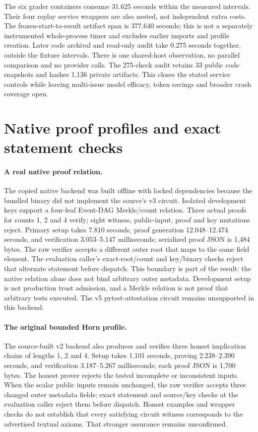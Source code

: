 The six grader containers consume 31.625 seconds within the measured
intervals. Their four replay service wrappers are also nested, not independent
extra costs. The frozen-start-to-result artifact span is 377.640 seconds;
this is not a separately instrumented whole-process timer and excludes earlier
imports and profile creation. Later code archival and read-only audit take
0.275 seconds together, outside the fixture intervals. There is one
shared-host observation, no parallel comparison and no provider calls.
The 275-check audit retains 33 public code snapshots and hashes 1,136
private artifacts. This closes the stated service controls while leaving
multi-issue model efficacy, token savings and broader crash coverage open.

\section{Native proof profiles and exact statement checks}
\label{sec:incremental-native-proof}
\paragraph{A real native proof relation.}
The copied native backend was built offline with locked dependencies because
the bundled binary did not implement the source's v3 circuit. Isolated
development keys support a four-leaf Event-DAG Merkle/count relation. Three
actual proofs for counts 1, 2 and 4 verify; eight witness, public-input,
proof and key mutations reject. Primary setup takes 7.810 seconds,
proof generation 12.048--12.474 seconds, and verification
3.053--5.147 milliseconds; serialized proof JSON is 1,484 bytes.
The raw verifier accepts a different outer root that maps to the same field
element. The evaluation caller's exact-root/count and key/binary checks reject
that alternate statement before dispatch. This boundary is part of the result:
the native relation alone does not bind arbitrary outer metadata. Development
setup is not production trust admission, and a Merkle relation is not proof
that arbitrary tests executed. The v5 pytest-attestation circuit remains
unsupported in this backend.

\paragraph{The original bounded Horn profile.}
The source-built v2 backend also produces and verifies three honest implication
chains of lengths 1, 2 and 4. Setup takes 1.101 seconds, proving
2.238--2.390 seconds, and verification
3.187--5.267 milliseconds; each proof JSON is 1,700 bytes.
The honest prover rejects the tested incomplete or inconsistent inputs.
When the scalar public inputs remain unchanged, the raw verifier accepts three
changed outer metadata fields; exact statement and source/key checks at the
evaluation caller reject them before dispatch. Honest examples and wrapper
checks do not establish that every satisfying circuit witness corresponds to
the advertised textual axioms. That stronger assurance remains unconfirmed.

